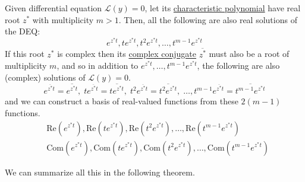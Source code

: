 \documentclass{article}
\newcounter{theorem}[section]
\begin{document}
      \begin{lemma}
        \label{thm:solutions-from-a-repeated-characteristic-root}
      Given differential equation $\mathcal{L}(y) = 0$, let its \hyperref[def:characteristic-polynomial]{characteristic polynomial} have real root $z^*$ with multiplicity $m > 1$. Then, all the following are also real solutions of the DEQ:  
      \begin{equation}
        e^{z^* t}, t e^{z^* t}, t^2 e^{z^* t}, \ldots, t^{m-1} e^{z^* t}
      \end{equation}
      If this root $z^*$ is complex then its \hyperref[cx-def:complex-conjugate]{complex conjugate} $\overline{z^*}$ must also be a root of multiplicity $m$, and so in addition to $e^{z^* t}, \ldots, t^{m-1} e^{z^* t}$, the following are also (complex) solutions of $\mathcal{L}(y) = 0$. 
      \begin{equation}
        e^{\overline{z^*} t} = \overline{e^{z^* t}}, \; t e^{\overline{z^*} t} = \overline{t e^{z^* t}}, \; t^2 e^{\overline{z^*} t} = \overline{t^2 e^{z^* t}}, \; \ldots, t^{m-1} e^{\overline{z^*} t} = \overline{t^{m-1} e^{z^* t}}
      \end{equation}
      and we can construct a basis of real-valued functions from these $2 (m-1)$ functions. 
      \begin{align*}
          &\text{Re}(e^{z^* t}), \text{Re}(t e^{z^* t}), \text{Re}(t^2 e^{z^* t}), \ldots,  \text{Re}(t^{m-1} e^{z^* t}) \\
          &\text{Com}(e^{z^* t}), \text{Com}(t e^{z^* t}), \text{Com}(t^2 e^{z^* t}), \ldots, \text{Com}(t^{m-1} e^{z^* t})
      \end{align*}
      \end{lemma}

      We can summarize all this in the following theorem. 
\end{document}
